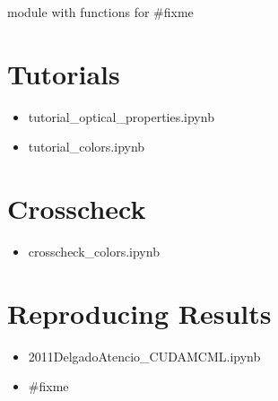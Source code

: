 \documentclass[letterpaper,10pt,english]{sphinxmanual}
\begin{document}
\begin{DUlineblock}{0em}
\item[] \sphinxhyphen{} 
\item[] module with functions for \#fixme
\end{DUlineblock}


\chapter{Tutorials}
\label{\detokenize{index:tutorials}}\begin{itemize}
\item {} 
\sphinxAtStartPar
tutorial\_optical\_properties.ipynb

\item {} 
\sphinxAtStartPar
tutorial\_colors.ipynb

\end{itemize}


\chapter{Crosscheck}
\label{\detokenize{index:crosscheck}}\begin{itemize}
\item {} 
\sphinxAtStartPar
crosscheck\_colors.ipynb

\end{itemize}


\chapter{Reproducing Results}
\label{\detokenize{index:reproducing-results}}\begin{itemize}
\item {} 
\sphinxAtStartPar
2011DelgadoAtencio\_CUDAMCML.ipynb

\item {} 
\sphinxAtStartPar
\#fixme

\end{itemize}
\end{document}

